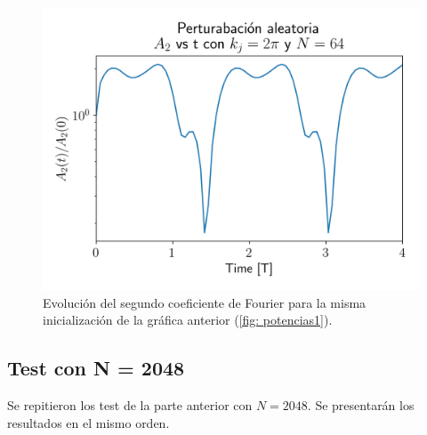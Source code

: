 \documentclass[notitlepage,letterpaper,12pt]{article} %
\begin{document}
\begin{figure}[H]
  \centering
   \includegraphics[scale= 0.6]{2Jeans2Coef.png}
  \caption{Evolución del segundo coeficiente de Fourier para la misma inicialización de la gráfica anterior (\ref{fig: potencias1}).}
  \label{fig: coef1}
\end{figure}

\subsection{Test con N = 2048}
Se repitieron los test de la parte anterior con $N = 2048$.
Se presentarán los resultados en el mismo orden.









\end{document}
